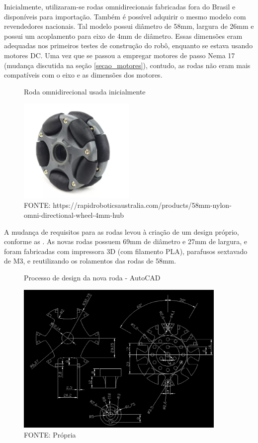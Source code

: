 Inicialmente, utilizaram-se rodas omnidirecionais fabricadas fora do Brasil e disponíveis para importação. Também é
possível adquirir o mesmo modelo com revendedores nacionais.
Tal modelo possui diâmetro de 58mm, largura de 26mm e possui um acoplamento para eixo de 4mm de diâmetro. Essas
dimensões eram adequadas nos primeiros testes de construção do robô, enquanto se estava usando motores DC. Uma vez que
se passou a empregar motores de passo Nema 17 (mudança discutida na seção \ref{secao_motores}), contudo, as rodas não eram
mais compatíveis com o eixo e as dimensões dos motores.

\begin{figure}[h]
	\centering
	\caption{Roda omnidirecional usada inicialmente}
	\includegraphics[width=0.5\textwidth]{figures/roda_china.png}
    \caption*{FONTE: https://rapidroboticsaustralia.com/products/58mm-nylon-omni-directional-wheel-4mm-hub}
\end{figure}

A mudança de requisitos para as rodas levou à criação de um design próprio, conforme as
.
As novas rodas possuem 69mm de diâmetro e 27mm de largura,
e foram fabricadas com impressora
3D (com filamento PLA), parafusos sextavado de M3, e reutilizando os rolamentos das rodas de 58mm.

\begin{figure}[h]
	\centering
	\caption{Processo de design da nova roda - AutoCAD}
	\label{new_wheel_cad_design}
	\includegraphics[width=0.9\textwidth]{figures/roda_processo_desing_passo1}
    \caption*{FONTE: Própria}
\end{figure}

